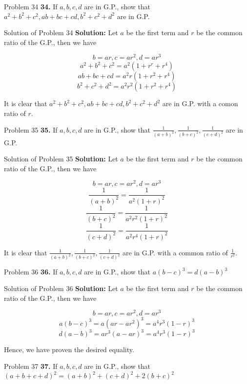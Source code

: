\documentclass[aspectratio=1610,8pt]{beamer}
\begin{document}
\begin{frame}{Problem 34}
  \textbf{34.} If $a, b, c, d$ are in G.P., show that $a^2 + b^2 + c^2, ab + bc
  + cd, b^2 + c^2 + d^2$ are in G.P.
\end{frame}
\begin{frame}{Solution of Problem 34}
  \textbf{Solution:} Let $a$ be the first term and $r$ be the common ratio of
  the G.P., then we have

  $$b = ar, c = ar^2, d = ar^3$$
  $$a^2 + b^2 + c^2 = a^2(1 + r^r + r^4)$$
  $$ab + bc + cd = a^2r(1 + r^2 + r^4)$$
  $$b^2 + c^2 + d^2 = a^2r^2(1 + r^2 + r^4)$$

  It is clear that $a^2 + b^2 + c^2, ab + bc + cd, b^2 + c^2 + d^2$ are in
  G.P. with a comon ratio of $r.$
\end{frame}
\begin{frame}{Problem 35}
  \textbf{35.} If $a, b, c, d$ are in G.P., show that $\frac{1}{(a + b)^2}, \frac{1}{(b + c)^2}, \frac{1}{(c + d)^2}$ are in G.P.
\end{frame}
\begin{frame}{Solution of Problem 35}
  \textbf{Solution:} Let $a$ be the first term and $r$ be the common ratio of
  the G.P., then we have

  $$b = ar, c = ar^2, d = ar^3$$
  $$\frac{1}{(a + b)^2} = \frac{1}{a^2(1 + r)^2}$$
  $$\frac{1}{(b + c)^2} = \frac{1}{a^2r^2(1 + r)^2}$$
  $$\frac{1}{(c + d)^2} = \frac{1}{a^2r^4(1 + r)^2}$$

  It is clear that $\frac{1}{(a + b)^2}, \frac{1}{(b + c)^2}, \frac{1}{(c +
    d)^2}$ are in G.P. with a common ratio of $\frac{1}{r^2}.$
\end{frame}
\begin{frame}{Problem 36}
  \textbf{36.} If $a, b, c, d$ are in G.P., show that $a(b - c)^3 = d(a - b)^3$
\end{frame}
\begin{frame}{Solution of Problem 36}
  \textbf{Solution:} Let $a$ be the first term and $r$ be the common ratio of
  the G.P., then we have

  $$b = ar, c = ar^2, d = ar^3$$
  $$a(b - c)^3 = a(ar - ar^2)^3 = a^4r^3(1 - r)^3$$
  $$d(a - b)^3 = ar^3(a - ar)^3 = a^4r^3(1 - r)^3$$

  Hence, we have proven the desired equality.
\end{frame}
\begin{frame}{Problem 37}
  \textbf{37.} If $a, b, c, d$ are in G.P., show that $(a + b + c + d)^2 = (a +
  b)^2 + (c + d)^2 + 2(b + c)^2$
\end{frame}
\end{document}
